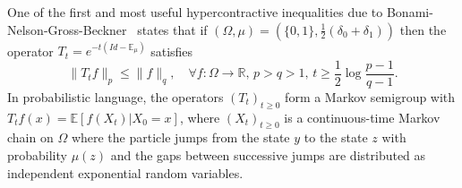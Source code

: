\documentclass[11pt]{amsart}
\newcommand{\R}{\mathbb{R}}
\newcommand{\E}{\mathbb{E}}
\newcommand{\1}{\mathbf{1}}
\def\R{{\mathbb R}}
\def\E{{\mathbb E}}
\theoremstyle{definition}
\theoremstyle{plain}
\theoremstyle{remark}
\numberwithin{equation}{section}
\begin{document}
One of the first and most useful hypercontractive inequalities
due to Bonami-Nelson-Gross-Beckner~\cite{Bonami:70,Nelson:73,Gross:75,Beckner:75} states that if
$(\Omega,\mu) = (\{0,1\},\frac{1}{2} (\delta_0 + \delta_1))$ then the operator
$T_t = e^{-t(Id - \E_\mu)}$ satisfies
\begin{equation} \label{eq:beckner}
\|T_t f \|_p \leq \| f \|_q, \quad \forall f : \Omega \to \R,\, p > q > 1,\, t \geq \frac{1}{2} \log \frac{p-1}{q-1}.
\end{equation}
In probabilistic language, the operators $(T_t)_{ t \ge 0}$ form a Markov semigroup with $T_t f(x) = \E [ f(X_t) |X_0 =x]$, where  $(X_t)_{ t \ge 0} $ is a  continuous-time Markov chain on $\Omega$ where  the particle jumps from the state $y$ to the state  $z$ with probability $\mu(z)$ and the gaps between successive jumps are distributed as independent exponential random variables.
\end{document}
